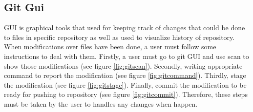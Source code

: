 \documentclass[11pt]{report}
\begin{document}
\subsection{Git Gui}
\label{subsec: gitgui}
GUI is graphical tools that used for keeping track of changes that could be done to files in specific repository as well as used to visualize history of repository. When modifications over files have been done, a user must follow some instructions to deal with them. Firstly, a user must go to git GUI and use scan to show those modifications (see figure \ref{fig:gitscan}). Secondly, writing appropriate command to report the modification (see figure \ref{fig:gitcommand}). Thirdly, stage the modification (see figure \ref{fig:gitstage}). Finally, commit the modification to be ready for pushing to repository (see figure \ref{fig:gitcommit}). Therefore, these steps must be taken by the user to handles any changes when happen.
\end{document}
